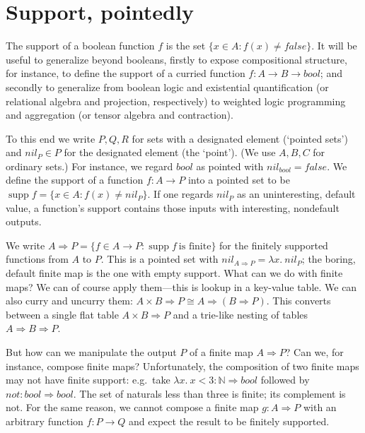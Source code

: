 \documentclass[runningheads]{llncs}
\DeclareMathOperator{\support}{supp}
\newcommand\name[1]{\ensuremath{\mathit{#1}}}
\newcommand\<\:                 %
\newcommand\fnspace{\<}         %
\newcommand\fn[1]{\lambda{#1}.\fnspace}
\newcommand\fto\Rightarrow
\newcommand\typename\textit
\newcommand\bool{\typename{bool}}
\newcommand\nil{\name{nil}}
\newcommand\false{\name{false}}
\newcommand\nat{\mathbb{N}}
\begin{document}

\section{Support, pointedly}

\label{sec:support}

The support of a boolean function $f$ is the set $\{ x \in A : f(x) \ne \false \}$.
It will be useful to generalize beyond booleans,
firstly to expose compositional structure, for instance, to define the support of a curried function $f : A \to B \to \bool$;
and secondly to generalize from boolean logic and existential quantification (or relational algebra and projection, respectively) to weighted logic programming and aggregation (or tensor algebra and contraction).

To this end we write $P,Q,R$ for sets with a designated element (`pointed sets') and $\nil_P \in P$ for the designated element (the `point').
(We use $A,B,C$ for ordinary sets.)
For instance, we regard $\bool$ as pointed with $\nil_\bool = \false$.
We define the support of a function $f : A \to P$ into a pointed set to be $\support f = \{ x \in A : f(x) \ne \nil_P \}$.
%
If one regards $\nil_P$ as an uninteresting, default value, a function's support contains those inputs with interesting, nondefault outputs.

We write $A \fto P = \{ f \in A \to P : \support f ~\text{is finite} \}$ for the finitely supported functions from $A$ to $P$.
This is a pointed set with $\nil_{A \fto P} = \fn{x} \nil_P$;
the boring, default finite map is the one with empty support.
What can we do with finite maps?
We can of course apply them---this is lookup in a key-value table.
We can also curry and uncurry them: $A \times B \fto P \cong A \fto (B \fto P)$.
This converts between a single flat table $A \times B \fto P$ and a trie-like nesting of tables $A \fto B \fto P$.

But how can we manipulate the output $P$ of a finite map $A \fto P$?
Can we, for instance, compose finite maps?
%
Unfortunately, the composition of two finite maps may not have finite support:
e.g.\ take $\fn{x} x < 3 : \nat \fto \bool$ followed by $\name{not} : \bool \fto \bool$.
The set of naturals less than three is finite; its complement is not.
%
For the same reason, we cannot compose a finite map $g : A \fto P$ with an arbitrary function $f : P \to Q$ and expect the result to be finitely supported.
\end{document}
